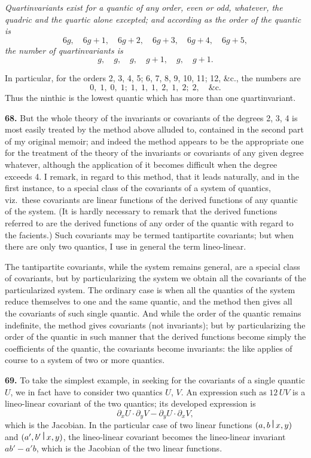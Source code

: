 \documentclass[12pt,a4paper]{article}
\theoremstyle{definition}
\begin{document}
\textit{Quartinvariants exist for a quantic of any order, even or odd, whatever, the quadric and the quartic alone excepted; and according as the order of the quantic is}
\[6g,\quad 6g+1,\quad 6g+2,\quad 6g+3,\quad 6g+4,\quad 6g+5,\]
\textit{the number of quartinvariants is}
\[g,\quad g,\quad g,\quad g+1,\quad g,\quad g+1.\]

In particular, for the orders 2, 3, 4, 5; 6, 7, 8, 9, 10, 11; 12, \&c., the numbers are
\[0,\; 1,\; 0,\; 1;\; 1,\; 1,\; 1,\; 2,\; 1,\; 2;\; 2, \quad \&\text{c.}\]
Thus the ninthic is the lowest quantic which has more than one quartinvariant.

\medskip
\noindent\textbf{68.} But the whole theory of the invariants or covariants of the degrees 2, 3, 4 is most easily treated by the method above alluded to, contained in the second part of my original memoir; and indeed the method appears to be the appropriate one for the treatment of the theory of the invariants or covariants of any given degree whatever, although the application of it becomes difficult when the degree exceeds 4. I remark, in regard to this method, that it leads naturally, and in the first instance, to a special class of the covariants of a system of quantics, viz.\ these covariants are linear functions of the derived functions of any quantic of the system. (It is hardly necessary to remark that the derived functions referred to are the derived functions of any order of the quantic with regard to the facients.) Such covariants may be termed tantipartite covariants; but when there are only two quantics, I use in general the term lineo-linear.

The tantipartite covariants, while the system remains general, are a special class of covariants, but by particularizing the system we obtain all the covariants of the particularized system. The ordinary case is when all the quantics of the system reduce themselves to one and the same quantic, and the method then gives all the covariants of such single quantic. And while the order of the quantic remains indefinite, the method gives covariants (not invariants); but by particularizing the order of the quantic in such manner that the derived functions become simply the coefficients of the quantic, the covariants become invariants: the like applies of course to a system of two or more quantics.

\newpage

\medskip
\noindent\textbf{69.} To take the simplest example, in seeking for the covariants of a single quantic $U$, we in fact have to consider two quantics $U$, $V$. An expression such as $12\,UV$ is a lineo-linear covariant of the two quantics; its developed expression is
\[\partial_x U \cdot \partial_y V - \partial_y U \cdot \partial_x V,\]
which is the Jacobian. In the particular case of two linear functions $(a,b\,\raisebox{0.5ex}{\textbf{\textbar}}\,x,y)$ and $(a',b'\,\raisebox{0.5ex}{\textbf{\textbar}}\,x,y)$, the lineo-linear covariant becomes the lineo-linear invariant $ab'-a'b$, which is the Jacobian of the two linear functions.
\end{document}
